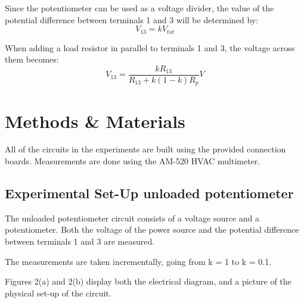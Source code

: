 \documentclass[a4paper]{article}
\begin{document}
Since the potentiometer can be used as a voltage divider, the value of the
potential difference between terminals 1 and 3 will be determined by:
\begin{equation}
    V_{13} = k V_{tot}
\end{equation} 

When adding a load resistor in parallel to terminals 1 and 3, the voltage across
them becomes:
\begin{equation}
    V_{13} = \frac{kR_{13}}{R_{13}+k(1-k)R_p} V
\end{equation}
\section{Methods \& Materials}
All of the circuits in the experiments are built using the provided connection
boards. Measurements are done using the AM-520 HVAC multimeter.
\newpage
\subsection{Experimental Set-Up unloaded potentiometer}
The unloaded potentiometer circuit consists of a voltage source and a
potentiometer. Both the voltage of the power source and the potential difference
between terminals 1 and 3 are measured.

The measurements are taken
incrementally, going from k = 1 to k = 0.1.

Figures 2(a) and 2(b) display both
the electrical diagram, and a picture of the physical set-up of the circuit.
\end{document}
